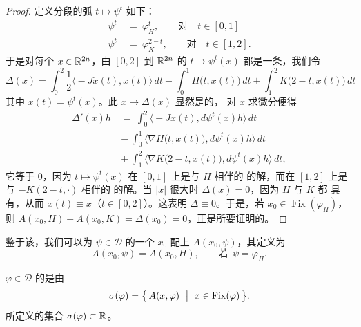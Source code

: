\begin{proof}
定义分段\trSmooth{}的弧 $t\mapsto\psi^{t}$ 如下：
\begin{align*}
\psi^{t}\ &=\ \varphi_{H}^{t},\qquad\text{对}\quad t\in[0,1]\\
\psi^{t}\ &=\ \varphi_{K}^{2-t},\qquad\text{对}\quad t\in[1,2].
\end{align*}
于是对每个 $x\in\mathbb{R}^{2n}$，由 $[0,2]$ 到 $\mathbb{R}^{2n}$ 的\trMapping{}%
$t\mapsto\psi^{t}(x)$ 都是一条\trLoop，我们令
\begin{equation*}
\Delta(x)=\int_{0}^{2}\frac{1}{2}\bigl\langle-J\dot{x}(t),x(t)\bigr\rangle\,dt%
-\int_{0}^{1}H\bigl(t,x(t)\bigr)\,dt+\int_{1}^{2}K\bigl(2-t,x(t)\bigr)\,dt
\end{equation*}
其中 $x(t)=\psi^{t}(x)$。此\trMapping{} $x\mapsto\Delta(x)$ 显然是\trSmooth{}的，%
对 $x$ 求微分便得
\begin{align*}
\Delta'(x)h\ &={}\ \int_{0}^{2}\bigl\langle-J\dot{x}(t),d\psi^{t}(x)h\bigr\rangle\,dt\\
&-\ \int_{0}^{1}\bigl\langle\nabla H\bigl(t,x(t)\bigr),d\psi^{t}(x)h\bigr\rangle\,dt\\
&+\ \int_{1}^{2}\bigl\langle\nabla K\bigl(2-t,x(t)\bigr),d\psi^{t}(x)h\bigr\rangle\,dt,
\end{align*}
它等于 $0$，因为 $t\mapsto\psi^{t}(x)$ 在 $[0,1]$ 上是与 $H$ 相伴的%
\trHamiltonianSystem{}的解，而在 $[1,2]$ 上是与 $-K(2-t,\cdot)$ 相伴的%
\trHamiltonianSystem{}的解。当 $|x|$ 很大时 $\Delta(x)=0$，因为 $H$ 与 $K$ 都%
具有\trCompactSupport，从而 $x(t)\equiv x$（$t\in[0,2]$）。这表明%
$\Delta\equiv0$。于是，若 $x_{0}\in\operatorname{Fix}(\varphi_{H})$，则%
$A(x_{0},H)-A(x_{0},K)=\Delta(x_{0})=0$，正是所要证明的。
\end{proof}

鉴于该\trhLemma，我们可以为\trMapping{} $\psi\in\mathcal{D}$ 的一个%
\trFixedPoint{} $x_{0}$ 配上\trAction{} $A(x_{0},\psi)$，其定义为
\begin{equation*}
A(x_{0},\psi)=A(x_{0},H),\qquad\text{若}\ \ \psi=\varphi_{H}.
\end{equation*}

\begin{definition}\label{def:action-spectrum}
$\varphi\in\mathcal{D}$ 的\trActionSpectrum{}是由
\begin{equation*}
\sigma(\varphi)=\bigl\{\,A(x,\varphi)\ \bigm|\ x\in\operatorname{Fix}(\varphi)\,\bigr\}.
\end{equation*}
所定义的集合 $\sigma(\varphi)\subset\mathbb{R}$。
\end{definition}

